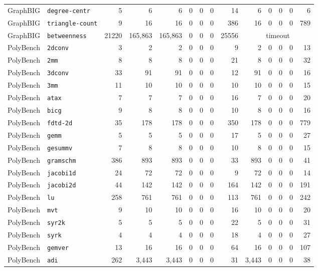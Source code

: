 \begin{tabular}{llrr|rrrrr|rrrrr}
GraphBIG & \texttt{degree-centr} & 5 & 6 & 6 & 0 & 0 & 0 & 14 & 6 & 0 & 0 & 0 & 6 \\
GraphBIG & \texttt{triangle-count} & 9 & 16 & 16 & 0 & 0 & 0 & 386 & 16 & 0 & 0 & 0 & 789 \\
GraphBIG & \texttt{betweenness} & 21220 & 165,863 & 165,863 & 0 & 0 & 0 & 25556 & \multicolumn{5}{c}{timeout} \\
\midrule
PolyBench & \texttt{2dconv} & 3 & 2 & 2 & 0 & 0 & 0 & 9 & 2 & 0 & 0 & 0 & 13 \\
PolyBench & \texttt{2mm} & 8 & 8 & 8 & 0 & 0 & 0 & 21 & 8 & 0 & 0 & 0 & 32 \\
PolyBench & \texttt{3dconv} & 33 & 91 & 91 & 0 & 0 & 0 & 12 & 91 & 0 & 0 & 0 & 16 \\
PolyBench & \texttt{3mm} & 11 & 10 & 10 & 0 & 0 & 0 & 10 & 10 & 0 & 0 & 0 & 15 \\
PolyBench & \texttt{atax} & 7 & 7 & 7 & 0 & 0 & 0 & 16 & 7 & 0 & 0 & 0 & 20 \\
PolyBench & \texttt{bicg} & 9 & 8 & 8 & 0 & 0 & 0 & 10 & 8 & 0 & 0 & 0 & 16 \\
PolyBench & \texttt{fdtd-2d} & 35 & 178 & 178 & 0 & 0 & 0 & 350 & 178 & 0 & 0 & 0 & 779 \\
PolyBench & \texttt{gemm} & 5 & 5 & 5 & 0 & 0 & 0 & 17 & 5 & 0 & 0 & 0 & 27 \\
PolyBench & \texttt{gesummv} & 7 & 8 & 8 & 0 & 0 & 0 & 10 & 8 & 0 & 0 & 0 & 15 \\
PolyBench & \texttt{gramschm} & 386 & 893 & 893 & 0 & 0 & 0 & 33 & 893 & 0 & 0 & 0 & 41 \\
PolyBench & \texttt{jacobi1d} & 24 & 72 & 72 & 0 & 0 & 0 & 9 & 72 & 0 & 0 & 0 & 14 \\
PolyBench & \texttt{jacobi2d} & 44 & 142 & 142 & 0 & 0 & 0 & 164 & 142 & 0 & 0 & 0 & 191 \\
PolyBench & \texttt{lu} & 258 & 761 & 761 & 0 & 0 & 0 & 113 & 761 & 0 & 0 & 0 & 242 \\
PolyBench & \texttt{mvt} & 9 & 10 & 10 & 0 & 0 & 0 & 16 & 10 & 0 & 0 & 0 & 20 \\
PolyBench & \texttt{syr2k} & 5 & 5 & 5 & 0 & 0 & 0 & 22 & 5 & 0 & 0 & 0 & 31 \\
PolyBench & \texttt{syrk} & 4 & 4 & 4 & 0 & 0 & 0 & 18 & 4 & 0 & 0 & 0 & 27 \\
PolyBench & \texttt{gemver} & 13 & 16 & 16 & 0 & 0 & 0 & 64 & 16 & 0 & 0 & 0 & 107 \\
PolyBench & \texttt{adi} & 262 & 3,443 & 3,443 & 0 & 0 & 0 & 31 & 3,443 & 0 & 0 & 0 & 38 \\
\bottomrule
\end{tabular}
